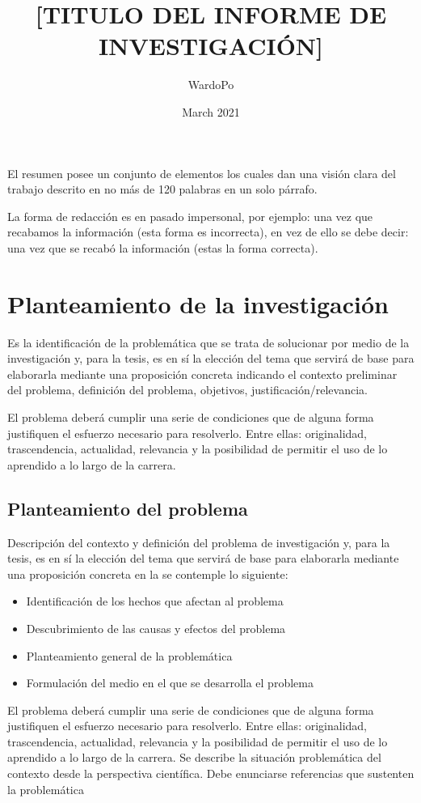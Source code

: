 \documentclass[12]{plan_tesis}
\title{[TITULO DEL  INFORME DE INVESTIGACIÓN]}
\author{WardoPo}
\date{March 2021}
\begin{document}


\begin{resumen}
El resumen posee un conjunto de elementos los cuales dan una visión clara del trabajo descrito en no más de 120 palabras en un solo párrafo.  

La forma de redacción es en pasado impersonal, por ejemplo: una vez que recabamos la información (esta forma es incorrecta), en vez de ello se debe decir: una vez que se recabó la información (estas la forma correcta).  
\end{resumen}

\chapter{Planteamiento de la investigación}
Es la identificación de la problemática que se trata de solucionar por medio de la investigación y, para la tesis, es en sí la elección del tema que servirá de base para elaborarla mediante una proposición concreta indicando el contexto preliminar del problema, definición del problema, objetivos, justificación/relevancia. 

El problema deberá cumplir una serie de condiciones que de alguna forma justifiquen el esfuerzo necesario para resolverlo. Entre ellas: originalidad, trascendencia, actualidad, relevancia y la posibilidad de permitir el uso de lo aprendido a lo largo de la carrera.

\section{Planteamiento del problema}
Descripción del contexto y definición del problema de investigación y, para la tesis, es en sí la elección del tema que servirá de base para elaborarla mediante una proposición concreta en la se contemple lo siguiente:

\begin{itemize}
    \item Identificación de los hechos que afectan al problema 
    \item Descubrimiento de las causas y efectos del problema 
    \item Planteamiento general de la problemática 
    \item Formulación del medio en el que se desarrolla el problema 
\end{itemize}

El problema deberá cumplir una serie de condiciones que de alguna forma justifiquen el esfuerzo necesario para resolverlo. Entre ellas: originalidad, trascendencia, actualidad, relevancia y la posibilidad de permitir el uso de lo aprendido a lo largo de la carrera. Se describe la situación problemática del contexto desde la perspectiva científica. Debe enunciarse referencias que sustenten la problemática 
\end{document}
